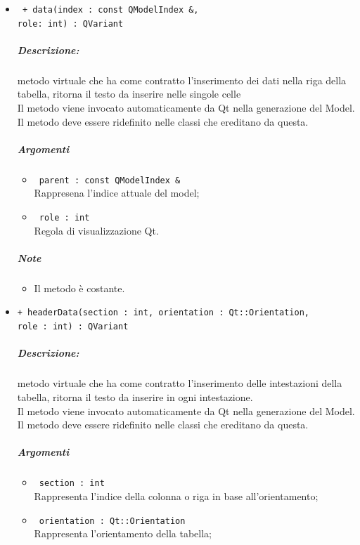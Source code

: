 \begin{itemize}
	\item \color{blue}\verb! + data(index : const QModelIndex &, !\\
					\verb!role: int) : QVariant!\\
	\color{black}
	\subparagraph{Descrizione:} metodo virtuale che ha come contratto l'inserimento dei dati nella riga della tabella, ritorna il testo da inserire nelle singole celle\\
		Il metodo viene invocato automaticamente da Qt\g{} nella generazione del Model.\\
		Il metodo deve essere ridefinito nelle classi che ereditano da questa.\\
	\subparagraph{Argomenti}
		\begin{itemize}
			\item \color{RoyalPurple}\verb! parent : const QModelIndex &!\\
			\color{black}Rappresena l'indice attuale del model;
			
			\item \color{RoyalPurple}\verb! role : int!\\
			\color{black}Regola di visualizzazione Qt\g{}.
		\end{itemize}
	\subparagraph{Note}
			\begin{itemize}
				\item Il metodo è costante.
			\end{itemize}
		
	\item \color{blue}\verb!+ headerData(section : int, orientation : Qt::Orientation,!\\
	  \verb!role : int) : QVariant!\\
	\color{black}
	\subparagraph{Descrizione:} metodo virtuale che ha come contratto l'inserimento delle intestazioni della tabella, ritorna il testo da inserire in ogni intestazione.\\
	Il metodo viene invocato automaticamente da Qt\g{} nella generazione del Model.\\
	Il metodo deve essere ridefinito nelle classi che ereditano da questa.\\
	\subparagraph{Argomenti}
		\begin{itemize}
			\item \color{RoyalPurple}\verb! section : int!\\
			\color{black}Rappresenta l'indice della colonna o riga in base all'orientamento;
			
			\item \color{RoyalPurple}\verb! orientation : Qt::Orientation!\\
			\color{black}Rappresenta l'orientamento della tabella;
			

\end{itemize}
\end{itemize}
